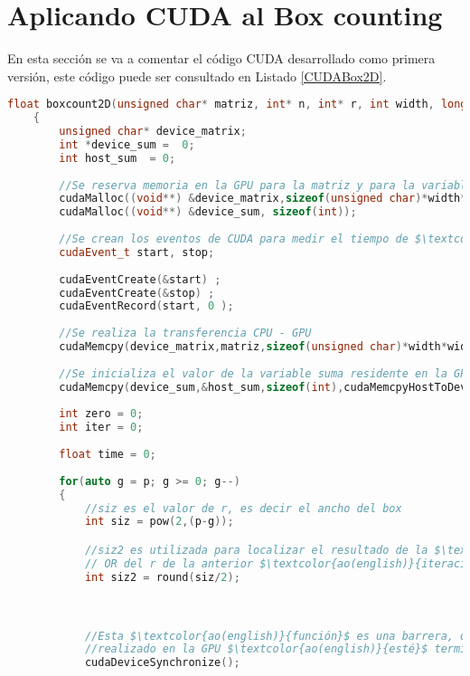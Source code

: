 \section{Aplicando CUDA al Box counting}

En esta sección se va a comentar el código CUDA desarrollado como primera versión, este código puede ser consultado en Listado \ref{CUDABox2D}.

\begin{lstlisting}[language=C++,caption={Primera versión del Boxcount2D paralelizado con CUDA},label=CUDABox2D,basicstyle=\tiny]
    float boxcount2D(unsigned char* matriz, int* n, int* r, int width, long p, int TPB)
    {
        unsigned char* device_matrix;
        int *device_sum =  0;
        int host_sum  = 0;
    
        //Se reserva memoria en la GPU para la matriz y para la variable suma
        cudaMalloc((void**) &device_matrix,sizeof(unsigned char)*width*width);
        cudaMalloc((void**) &device_sum, sizeof(int));
    
        //Se crean los eventos de CUDA para medir el tiempo de $\textcolor{ao(english)}{ejecución}$ del Boxcount
        cudaEvent_t start, stop;
        
        cudaEventCreate(&start) ;
        cudaEventCreate(&stop) ;
        cudaEventRecord(start, 0 );
    
        //Se realiza la transferencia CPU - GPU
        cudaMemcpy(device_matrix,matriz,sizeof(unsigned char)*width*width,cudaMemcpyHostToDevice);
        
        //Se inicializa el valor de la variable suma residente en la GPU a 0
        cudaMemcpy(device_sum,&host_sum,sizeof(int),cudaMemcpyHostToDevice);
    
        int zero = 0;
        int iter = 0;
    
        float time = 0;
    
        for(auto g = p; g >= 0; g--)
        {
            //siz es el valor de r, es decir el ancho del box
            int siz = pow(2,(p-g));

            //siz2 es utilizada para localizar el resultado de la $\textcolor{ao(english)}{operación}$ 
            // OR del r de la anterior $\textcolor{ao(english)}{iteración}$
            int siz2 = round(siz/2);



            //Esta $\textcolor{ao(english)}{función}$ es una barrera, que obliga a esperar a que todo el trabajo 
            //realizado en la GPU $\textcolor{ao(english)}{esté}$ terminado.
            cudaDeviceSynchronize();
    

\end{lstlisting}
